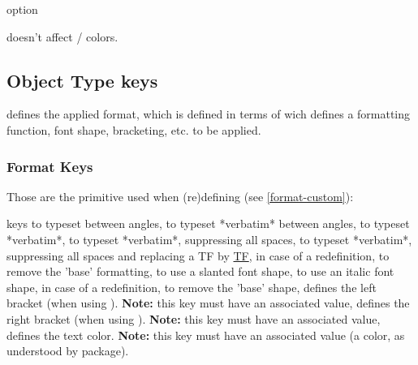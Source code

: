 \documentclass{article}
\begin{document}
\begin{describelist}{option}
\end{describelist}
\begin{tsremark}
   doesn't affect  /  colors.
\end{tsremark}

\subsection{Object Type keys}\label{obj-type-def}

 defines the applied format, which is defined in terms of  wich defines a formatting function, font shape, bracketing, etc. to be applied.

\subsubsection{Format Keys}\label{format-keys}
Those are the primitive  used when (re)defining   (see \ref{format-custom}):
\begin{describelist*}{keys}
   {to typeset between angles,}
   {to typeset *verbatim* between angles,}
   {to typeset *verbatim*,}
   {to typeset *verbatim*, suppressing all spaces,}
   {to typeset *verbatim*, suppressing all spaces and replacing a TF by \underline{TF},}
   {in case of a redefinition, to remove the 'base' formatting,}
   {to use a slanted font shape,}
   {to use an italic font shape,}
   {in case of a redefinition, to remove the 'base' shape,}
    {defines the left bracket (when using \tsobj{\tsargs}). \textbf{Note:} this key must have an associated value,}
    {defines the right bracket (when using \tsobj{\tsargs}). \textbf{Note:} this key must have an associated value,}
     {defines the text color. \textbf{Note:} this key must have an associated value (a color, as understood by  package).}
\end{describelist*}
\end{document}
